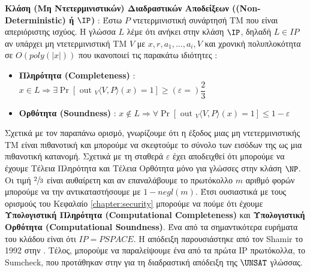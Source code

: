 \begin{definition}
\textbf{Κλάση (Μη Ντετερμινιστικών) Διαδραστικών Αποδείξεων ((Non-Deter\-ministic)  ή $\IP$)} : Έστω $P$ ντετερμινιστική συνάρτησή ΤΜ που είναι απεριόριστης ισχύος. Η γλώσσα $L$ λέμε ότι ανήκει στην κλάση $\IP$, δηλαδή $L \in IP$ αν υπάρχει μη ντετερμινιστική ΤΜ $V$ με $x, r, a_{1}, \ldots, a_{i}, V$ και χρονική πολυπλοκότητα σε $O(poly(|x|))$ που ικανοποιεί τις παρακάτω ιδιότητες :
\begin{itemize}
    \item \textbf{Πληρότητα (Completeness)} : $x \in L \Rightarrow \exists \operatorname{Pr}\left[\text { out }_{V}\langle V, P\rangle(x)=1\right] \geq (ε=) \dfrac{2}{3}$
    \item \textbf{Ορθότητα (Soundness)} : $x \notin L \Rightarrow \forall \operatorname{Pr}\left[\text { out }_{V}\langle V, P\rangle(x)=1\right] \leq 1 - ε$
\end{itemize}
\end{definition}

Σχετικά με τον παραπάνω ορισμό, γνωρίζουμε ότι η έξοδος μιας μη ντετερμινιστικής ΤΜ είναι πιθανοτική και μπορούμε να σκεφτούμε το σύνολο των εισόδων της ως μια πιθανοτική κατανομή. Σχετικά με τη σταθερά $ε$ έχει αποδειχθεί ότι μπορούμε να έχουμε Τέλεια Πληρότητα και Τέλεια Ορθότητα μόνο για γλώσσες στην κλάση $\NP$. Οι τιμή $\sfrac{2}{3}$ είναι αυθαίρετη και αν επαναλάβουμε το πρωτόκολλο $m$ αριθμό φορών μπορούμε να την αντικαταστήσουμε με $1-negl(m)$. Έτσι ουσιαστικά με τους ορισμούς του Κεφαλαίο \ref{chapter:security} μπορούμε να πούμε ότι έχουμε \textbf{Υπολογιστική Πληρότητα (Computational Completeness)} και \textbf{Υπολογιστική Ορθότητα (Computational Soundness)}. Ένα από τα σημαντικότερα ευρήματα του κλάδου είναι ότι $IP=PSPACE$. Η απόδειξη παρουσιάστηκε από τον Shamir το 1992 στην \cite{shamir1992ip}. Τέλος, μπορούμε να παραλείψουμε ένα από τα πρώτα IP πρωτόκολλα, το Sumcheck, που προτάθηκαν στην \cite{lund1992algebraic} για τη διαδραστική απόδειξη της $\UNSAT$ γλώσσας.